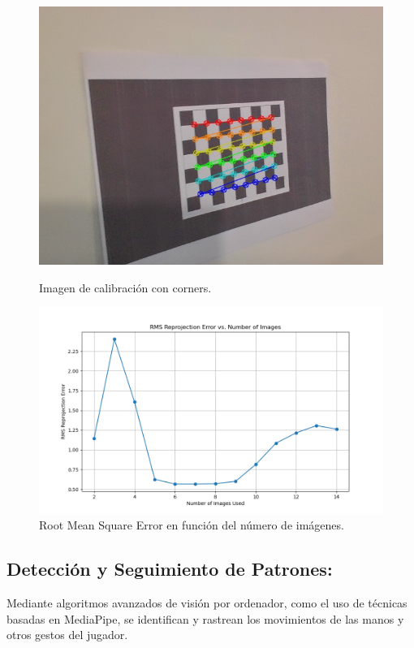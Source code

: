 \begin{figure}[H]
    \centering
    \begin{minipage}{0.45\textwidth} 
        \centering
        \includegraphics[width=\linewidth]{CAPS/CAP1.jpg}
        \caption{Imagen de calibración con corners.}
        \label{fig:imagen1}
    \end{minipage}\hfill
    \begin{minipage}{0.45\textwidth} 
        \centering
        \includegraphics[width=\linewidth]{CAPS/CAP2.png}
        \caption{Root Mean Square Error en función del número de imágenes.}
        \label{fig:imagen2}
    \end{minipage}
\end{figure}


\subsection{Detección y Seguimiento de Patrones:}
Mediante algoritmos avanzados de visión por ordenador, como el uso de técnicas basadas en MediaPipe, se identifican y rastrean los movimientos de las manos y otros gestos del jugador.

